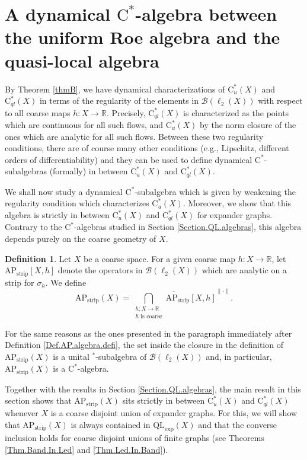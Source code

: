 \documentclass[11pt]{amsart}
\newcommand{\R}{\mathbb{R}}
\newcommand{\cB}{\mathcal{B}}
\newcommand{\cstu}{\mathrm{C}^*_u}
\newcommand{\cstql}{\mathrm{C}^*_{\textit{ql}}}
\newcommand{\cstar}{$\mathrm{C}^*$}
\newcommand{\AP}{\mathrm{AP}}
\numberwithin{equation}{section}
\theoremstyle{definition}
\newtheorem{definition}[theorem]{Definition}
\theoremstyle{remark}
\begin{document}
\section{A dynamical \cstar-algebra between the uniform Roe algebra and the quasi-local algebra}
\label{Section.Dynamical.algebra.between.URA.QL}
By Theorem \ref{thmB}, we have dynamical characterizations of $\cstu(X)$ and $\cstql(X)$ in terms of the regularity of the elements in $\cB(\ell_2(X))$ with respect to all coarse maps $h\colon X\to \R$. Precisely, $\cstql(X)$ is characterized as the points which are continuous for all such flows, and $\cstu(X)$ by the norm closure of the ones which are analytic  for all such flows. Between these two regularity conditions, there are of course many other conditions (e.g., Lipschitz, different orders of differentiability)  and they can be used to define dynamical \cstar-subalgebras (formally) in between $\cstu(X)$ and $\cstql(X)$.

We shall now study a dynamical  \cstar-subalgebra which is given by weakening the regularity condition which characterizes $\cstu(X)$. Moreover,   we show that this  algebra is strictly in between $\cstu(X)$ and $\cstql(X)$ for expander graphs. Contrary to the \cstar-algebras studied in Section \ref{Section.QL.algebras}, this algebra depends purely on the coarse geometry of $X$.

\begin{definition} \label{Defi.AP_band}
Let $X$ be a coarse space. For a given coarse map $h\colon X\to \R$, let $\AP_{\mathrm{strip}}[X,h]$ denote the  operators in $\cB(\ell_2(X))$ which are analytic on a strip for $\sigma_h$. We define
\[\AP_{\mathrm{strip}}(X)=\overline{\bigcap_{\substack{h\colon X\to \R\\ h\text{ is coarse}}}\AP_{\mathrm{strip}}[X,h]}^{\|\cdot\|}.\]
\end{definition}


For the same reasons as the ones presented in the paragraph immediately after Definition \ref{Def.AP.algebra.defi}, the   set inside the closure in the definition of $\AP_{\mathrm{strip}}(X)$   is a unital $^*$-subalgebra of $\cB(\ell_2(X))$ and, in particular,  $\AP_{\mathrm{strip}}(X)$ is a \cstar-algebra.

Together with the results in Section \ref{Section.QL.algebras}, the main result in this section shows that $\AP_{\mathrm{strip}}(X)$ sits strictly in between $\cstu(X)$ and $\cstql(X)$ whenever $X$ is a coarse disjoint union of expander graphs. For this, we will show that $\mathrm{AP}_{\mathrm{strip}}(X)$ is always contained in  $\mathrm{QL}_{\exp}(X)$ and that the converse inclusion holds for coarse disjoint unions of finite graphs (see Theorems \ref{Thm.Band.In.Led} and \ref{Thm.Led.In.Band}).
\end{document}
